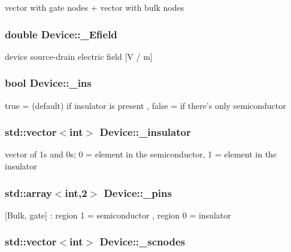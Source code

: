 vector with gate nodes + vector with bulk nodes \hypertarget{classDevice_af793e2c95dbadc7e317cd63d4f689d74}{
\subsubsection[{\-\_\-\-Efield}]{\setlength{\rightskip}{0pt plus 5cm}double Device\-::\-\_\-\-Efield\hspace{0.3cm}{\ttfamily [protected]}}}\label{classDevice_af793e2c95dbadc7e317cd63d4f689d74}
device source-\/drain electric field \mbox{[}V / m\mbox{]} \hypertarget{classDevice_a6a2533da6415d36d8c5f97f8562a4b4d}{
\subsubsection[{\-\_\-ins}]{\setlength{\rightskip}{0pt plus 5cm}bool Device\-::\-\_\-ins\hspace{0.3cm}{\ttfamily [protected]}}}\label{classDevice_a6a2533da6415d36d8c5f97f8562a4b4d}
true = (default) if insulator is present , false = if there's only semiconductor \hypertarget{classDevice_a442a52d6324ed44754d078924e66736b}{
\subsubsection[{\-\_\-insulator}]{\setlength{\rightskip}{0pt plus 5cm}std\-::vector$<$int$>$ Device\-::\-\_\-insulator\hspace{0.3cm}{\ttfamily [protected]}}}\label{classDevice_a442a52d6324ed44754d078924e66736b}
vector of 1s and 0s; 0 = element in the semiconductor, 1 = element in the insulator \hypertarget{classDevice_a7217f5ba8adcda962f8936dda7bfb1c8}{
\subsubsection[{\-\_\-pins}]{\setlength{\rightskip}{0pt plus 5cm}std\-::array$<$int,2$>$ Device\-::\-\_\-pins\hspace{0.3cm}{\ttfamily [protected]}}}\label{classDevice_a7217f5ba8adcda962f8936dda7bfb1c8}
\mbox{[}Bulk, gate\mbox{]} \-: region 1 = semiconductor , region 0 = insulator \hypertarget{classDevice_adb12865709040d74f442b1ac77978883}{
\subsubsection[{\-\_\-scnodes}]{\setlength{\rightskip}{0pt plus 5cm}std\-::vector$<$int$>$ Device\-::\-\_\-scnodes\hspace{0.3cm}{\ttfamily [protected]}}}\label{classDevice_adb12865709040d74f442b1ac77978883}
